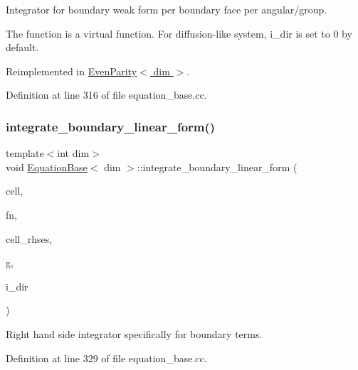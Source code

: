 Integrator for boundary weak form per boundary face per angular/group. 

The function is a virtual function. For diffusion-\/like system, i\+\_\+dir is set to 0 by default. 

Reimplemented in \hyperlink{class_even_parity_ae800cb49f85cf417167ca5385b50df6f}{Even\+Parity$<$ dim $>$}.



Definition at line 316 of file equation\+\_\+base.\+cc.

\mbox{\label{class_equation_base_a1a213c4e21984bead9146e50be97077f}} 
\subsubsection{\texorpdfstring{integrate\+\_\+boundary\+\_\+linear\+\_\+form()}{integrate\_boundary\_linear\_form()}}
{\footnotesize\ttfamily template$<$int dim$>$ \\
void \hyperlink{class_equation_base}{Equation\+Base}$<$ dim $>$\+::integrate\+\_\+boundary\+\_\+linear\+\_\+form (\begin{DoxyParamCaption}\item[{typename Do\+F\+Handler$<$ dim $>$\+::active\+\_\+cell\+\_\+iterator \&}]{cell,  }\item[{unsigned int \&}]{fn,  }\item[{Vector$<$ double $>$ \&}]{cell\+\_\+rhses,  }\item[{const unsigned int \&}]{g,  }\item[{const unsigned int \&}]{i\+\_\+dir }\end{DoxyParamCaption})\hspace{0.3cm}{\ttfamily [virtual]}}



Right hand side integrator specifically for boundary terms. 



Definition at line 329 of file equation\+\_\+base.\+cc.

\mbox{\label{class_equation_base_a7421b3c18433975ac794ac22c3af715a}} 

